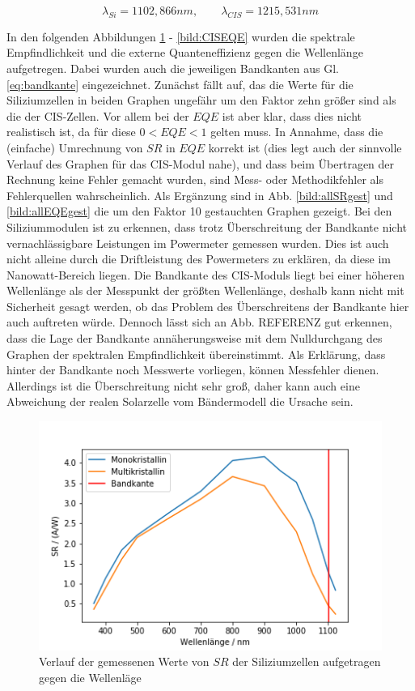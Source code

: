 \begin{equation}
\lambda_{Si} = 1102,866 nm, \qquad \lambda_{CIS} = 1215,531 nm
\label{eq:bandkante}
\end{equation}

In den folgenden Abbildungen \ref{bild:SiSRMess} - \ref{bild:CISEQE} wurden die spektrale Empfindlichkeit und die externe Quanteneffizienz gegen die Wellenlänge aufgetregen.
Dabei wurden auch die jeweiligen Bandkanten aus Gl. \ref{eq:bandkante} eingezeichnet.
Zunächst fällt auf, das die Werte für die Siliziumzellen in beiden Graphen ungefähr um den Faktor zehn größer sind als die der 
CIS-Zellen. Vor allem bei der $EQE$ ist aber klar, dass dies nicht realistisch ist, da für diese $0 < EQE < 1$ gelten muss.
In Annahme, dass die (einfache) Umrechnung von $SR$ in $EQE$ korrekt ist (dies legt auch der sinnvolle Verlauf des Graphen für 
das CIS-Modul nahe), und dass beim Übertragen der Rechnung keine Fehler gemacht wurden, sind Mess- oder Methodikfehler als Fehlerquellen
wahrscheinlich. Als Ergänzung sind in Abb. \ref{bild:allSRgest} und \ref{bild:allEQEgest} die um den Faktor 10 gestauchten Graphen gezeigt.
 Bei den Siliziummodulen ist zu erkennen, dass trotz 
Überschreitung der Bandkante nicht vernachlässigbare Leistungen im Powermeter gemessen wurden. Dies ist auch nicht alleine durch die 
Driftleistung des Powermeters zu erklären, da diese im Nanowatt-Bereich liegen. 
Die Bandkante des CIS-Moduls liegt bei einer höheren Wellenlänge als der Messpunkt der größten Wellenlänge, deshalb kann nicht mit 
Sicherheit gesagt werden, ob das Problem des Überschreitens der Bandkante hier auch auftreten würde. Dennoch lässt sich an Abb. 
REFERENZ gut erkennen, dass die Lage der Bandkante annäherungsweise mit dem Nulldurchgang des Graphen der spektralen Empfindlichkeit
übereinstimmt. Als Erklärung, dass hinter der Bandkante noch Messwerte vorliegen, können Messfehler dienen. Allerdings ist die 
Überschreitung nicht sehr groß, daher kann auch eine Abweichung der realen Solarzelle vom Bändermodell die Ursache sein. \\

\begin{figure}[h]
    \centering
    \includegraphics[scale=0.75]{Bilder/32SiSR.png}
    \caption{Verlauf der gemessenen Werte von $SR$ der Siliziumzellen aufgetragen gegen die Wellenläge}
    \label{bild:SiSRMess}
\end{figure}

